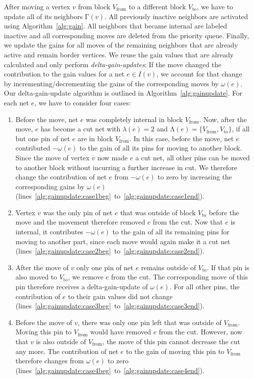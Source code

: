 \documentclass[runningheads,a4paper]{llncs}
\newcommand{\sschl}[1]{{\color{ForestGreen}[SS: #1]}}
\renewcommand{\sschl}[1]{}
\begin{document}
After moving a vertex $v$ from block $V_{\text{from}}$ to a different block $V_{\text{to}}$, we have to update all of its neighbors  $\mathrm{\Gamma}(v)$. 
All previously inactive neighbors are activated using Algorithm~\ref{alg:gain}. 
All neighbors that became internal are labeled inactive and all corresponding moves are deleted from the priority queue.
Finally,  we update the gains for all moves of the remaining neighbors that are already active and remain border vertices. 
We reuse the gain values that are already calculated and only perform \emph{delta-gain-updates}: 
If the move changed the contribution to the gain values for a net $e \in I(v)$, we
account for that change by incrementing/decrementing the gains of the corresponding moves by $\omega(e)$. 
Our delta-gain-update algorithm is outlined in Algorithm~\ref{alg:gainupdate}. For each net $e$, we have to consider four cases: \sschl{For TR, i could make a picture to show these cases}

\begin{enumerate}
\item Before the move, net $e$ was completely internal in block $V_{\text{from}}$. Now, after the move, $e$ has become a cut net with $\lambda(e) = 2$ and $\mathrm{\Lambda}(e) = \{V_{\text{from}}, V_{\text{to}}\}$, if all but one pin of net $e$ are in block $V_{\text{from}}$.
  In this case, before the move, net $e$ contributed $-\omega(e)$ to the gain of all its pins for moving to another block.
  Since the move of vertex $v$ now made $e$ a cut net, all other pins can be moved to another block without incurring a further increase in cut. We therefore change the contribution
  of net $e$ from $-\omega(e)$ to zero by increasing the corresponding gains by $\omega(e)$ (lines~\ref{alg:gainupdate:case1beg}~to~\ref{alg:gainupdate:case1end}).
\item Vertex $v$ was the only pin of net $e$ that was outside of block $V_{\text{to}}$ before the move and the movement therefore removed $e$ from the cut. 
  Now that $e$ is internal, it contributes $-\omega(e)$ to the gain of all its remaining pins for moving to another part, 
  since each move would again make it a cut net (lines~\ref{alg:gainupdate:case2beg}~to~\ref{alg:gainupdate:case2end}).
\item After the move of $v$ only one pin of net $e$ remains outside of $V_{\text{to}}$. If that pin is also moved to $V_{\text{to}}$, we remove $e$ from the cut. 
  The corresponding move of this pin therefore receives a delta-gain-update of $\omega(e)$. For all other pins, the contribution of $e$ to their gain values did not change 
  (lines~\ref{alg:gainupdate:case3beg}~to~\ref{alg:gainupdate:case3end}).
\item Before the move of $v$, there was only one pin left that was outside of $V_{\text{from}}$. Moving this pin to $V_{\text{from}}$ would have removed $e$ from the cut.
  However, now that $v$ is also outside of $V_{\text{from}}$, the move of this pin cannot decrease the cut any more. The contribution of net $e$ to the gain of moving this pin to $V_{\text{from}}$ 
  therefore changes from $\omega(e)$ to zero (lines~\ref{alg:gainupdate:case4beg}~to~\ref{alg:gainupdate:case4end}).
\end{enumerate}
\end{document}
